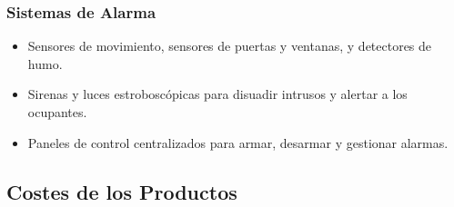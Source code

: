 \documentclass{report}
\begin{document}
            \subsubsection*{Sistemas de Alarma}
              \begin{itemize}
                \item Sensores de movimiento, sensores de puertas y ventanas, y detectores de humo.
                \item Sirenas y luces estroboscópicas para disuadir intrusos y alertar a los ocupantes.
                \item Paneles de control centralizados para armar, desarmar y gestionar alarmas.
              \end{itemize}
          \clearpage\subsection{Costes de los Productos}
\end{document}
